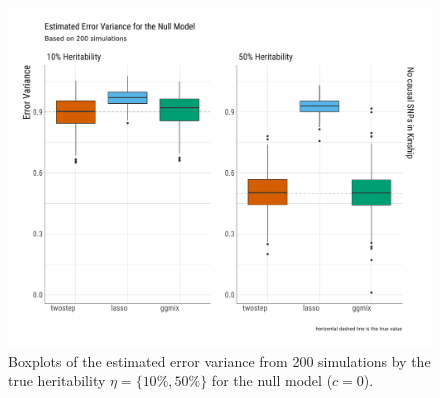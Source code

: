\documentclass[12pt,letter]{article}\usepackage[]{graphicx}\usepackage[]{color}
\newenvironment{knitrout}{}{} %
\begin{document}
\begin{knitrout}\scriptsize
{}\color{fgcolor}\begin{figure}[H]

{\centering \includegraphics[width=1\linewidth]{figure/plot-errorvar-sim-null-model-1} 

}

\caption[Boxplots of the estimated error variance from 200 simulations by the true heritability $\eta = \lbrace 10\%, 50\% \rbrace$ for the null model ($c=0$)]{Boxplots of the estimated error variance from 200 simulations by the true heritability $\eta = \lbrace 10\%, 50\% \rbrace$ for the null model ($c=0$).}\label{fig:plot-errorvar-sim-null-model}
\end{figure}


\end{knitrout}
\end{document}
